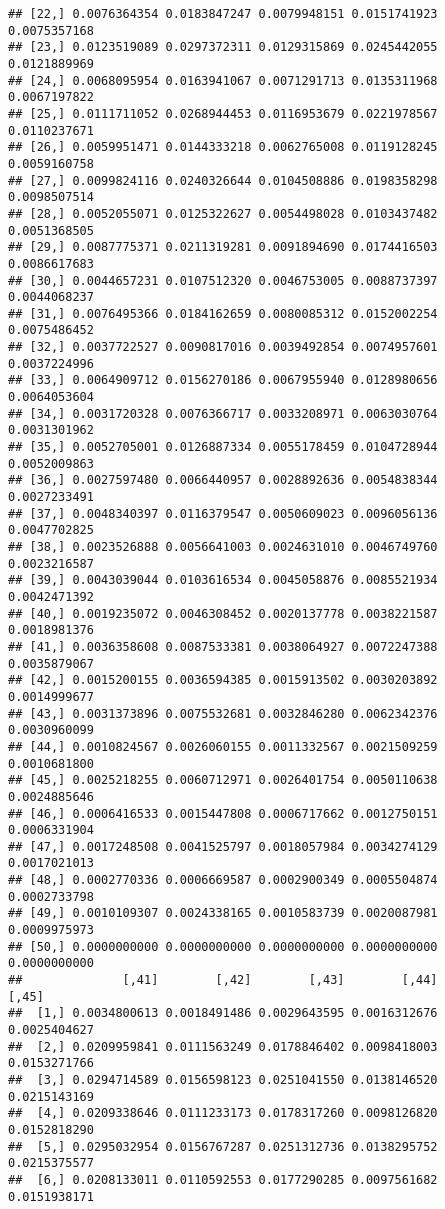 \documentclass[]{article}
\begin{document}
\begin{verbatim}
## [22,] 0.0076364354 0.0183847247 0.0079948151 0.0151741923 0.0075357168
## [23,] 0.0123519089 0.0297372311 0.0129315869 0.0245442055 0.0121889969
## [24,] 0.0068095954 0.0163941067 0.0071291713 0.0135311968 0.0067197822
## [25,] 0.0111711052 0.0268944453 0.0116953679 0.0221978567 0.0110237671
## [26,] 0.0059951471 0.0144333218 0.0062765008 0.0119128245 0.0059160758
## [27,] 0.0099824116 0.0240326644 0.0104508886 0.0198358298 0.0098507514
## [28,] 0.0052055071 0.0125322627 0.0054498028 0.0103437482 0.0051368505
## [29,] 0.0087775371 0.0211319281 0.0091894690 0.0174416503 0.0086617683
## [30,] 0.0044657231 0.0107512320 0.0046753005 0.0088737397 0.0044068237
## [31,] 0.0076495366 0.0184162659 0.0080085312 0.0152002254 0.0075486452
## [32,] 0.0037722527 0.0090817016 0.0039492854 0.0074957601 0.0037224996
## [33,] 0.0064909712 0.0156270186 0.0067955940 0.0128980656 0.0064053604
## [34,] 0.0031720328 0.0076366717 0.0033208971 0.0063030764 0.0031301962
## [35,] 0.0052705001 0.0126887334 0.0055178459 0.0104728944 0.0052009863
## [36,] 0.0027597480 0.0066440957 0.0028892636 0.0054838344 0.0027233491
## [37,] 0.0048340397 0.0116379547 0.0050609023 0.0096056136 0.0047702825
## [38,] 0.0023526888 0.0056641003 0.0024631010 0.0046749760 0.0023216587
## [39,] 0.0043039044 0.0103616534 0.0045058876 0.0085521934 0.0042471392
## [40,] 0.0019235072 0.0046308452 0.0020137778 0.0038221587 0.0018981376
## [41,] 0.0036358608 0.0087533381 0.0038064927 0.0072247388 0.0035879067
## [42,] 0.0015200155 0.0036594385 0.0015913502 0.0030203892 0.0014999677
## [43,] 0.0031373896 0.0075532681 0.0032846280 0.0062342376 0.0030960099
## [44,] 0.0010824567 0.0026060155 0.0011332567 0.0021509259 0.0010681800
## [45,] 0.0025218255 0.0060712971 0.0026401754 0.0050110638 0.0024885646
## [46,] 0.0006416533 0.0015447808 0.0006717662 0.0012750151 0.0006331904
## [47,] 0.0017248508 0.0041525797 0.0018057984 0.0034274129 0.0017021013
## [48,] 0.0002770336 0.0006669587 0.0002900349 0.0005504874 0.0002733798
## [49,] 0.0010109307 0.0024338165 0.0010583739 0.0020087981 0.0009975973
## [50,] 0.0000000000 0.0000000000 0.0000000000 0.0000000000 0.0000000000
##              [,41]        [,42]        [,43]        [,44]        [,45]
##  [1,] 0.0034800613 0.0018491486 0.0029643595 0.0016312676 0.0025404627
##  [2,] 0.0209959841 0.0111563249 0.0178846402 0.0098418003 0.0153271766
##  [3,] 0.0294714589 0.0156598123 0.0251041550 0.0138146520 0.0215143169
##  [4,] 0.0209338646 0.0111233173 0.0178317260 0.0098126820 0.0152818290
##  [5,] 0.0295032954 0.0156767287 0.0251312736 0.0138295752 0.0215375577
##  [6,] 0.0208133011 0.0110592553 0.0177290285 0.0097561682 0.0151938171

\end{verbatim}
\end{document}
